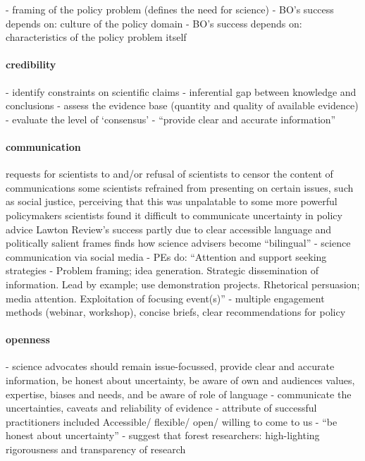 \cite{WesselinkH2020} - framing of the policy problem (defines the need for science)
\cite{WesselinkH2020} - BO's success depends on: culture of the policy domain
\cite{WesselinkH2020} - BO's success depends on: characteristics of the policy problem itself
\paragraph{credibility}
\cite{GluckmanBK2021} - identify constraints on scientific claims - inferential gap between knowledge and conclusions
\cite{GluckmanBK2021} - assess the evidence base (quantity and quality of available evidence)
\cite{GluckmanBK2021} - evaluate the level of `consensus'
\cite{ElsensohnACDGGKPRS2019} - ``provide clear and accurate information''
\paragraph{communication}
\cite{OjanenBKP2021} requests for scientists to and/or refusal of scientists to censor the content of communications
\cite{OjanenBKP2021} some scientists refrained from presenting on certain issues, such as social justice, perceiving that this was unpalatable to some more powerful policymakers
\cite{IbarraJOBCIMRS2022} scientists found it difficult to communicate uncertainty in policy advice
\cite{RoseBOP2018} Lawton Review's success partly due to clear accessible language and politically salient frames
\cite{Obermeister2022} finds how science advisers become ``bilingual''
\cite{LubchencoR2020} - science communication via social media 
\cite{vonMalmborg2024strategies} - PEs do: ``Attention and support seeking strategies - Problem framing; idea generation. Strategic dissemination of information. Lead by example; use demonstration projects. Rhetorical persuasion; media attention. Exploitation of focusing event(s)''
\cite{ThompsonD2024} - multiple engagement methods (webinar, workshop), concise briefs, clear recommendations for policy

\paragraph{openness}
\cite{ElsensohnACDGGKPRS2019} - science advocates should remain issue-focussed, provide clear and accurate information, be honest about uncertainty, be aware of own and audiences values, expertise, biases and needs, and be aware of role of language
\cite{GluckmanBK2021} - communicate the uncertainties, caveats and reliability of evidence
\cite{GogginEtAl2015} - attribute of successful practitioners included Accessible/ flexible/ open/ willing to come to us
\cite{ElsensohnACDGGKPRS2019} - ``be honest about uncertainty''
\cite{OjanenBKP2021} - suggest that forest researchers: high-lighting rigorousness and transparency of research

